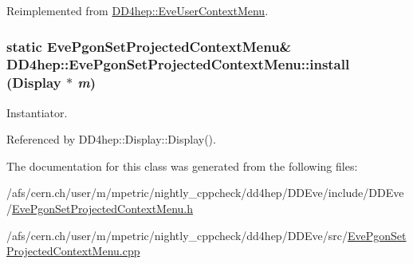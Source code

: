 Reimplemented from \hyperlink{class_d_d4hep_1_1_eve_user_context_menu_a05246cb30938d2a51dbb68468a3e8f8f}{DD4hep::EveUserContextMenu}.\hypertarget{class_d_d4hep_1_1_eve_pgon_set_projected_context_menu_a1704c29806f07b92caf26bee83b69722}{
\subsubsection[{install}]{\setlength{\rightskip}{0pt plus 5cm}static {\bf EvePgonSetProjectedContextMenu}\& DD4hep::EvePgonSetProjectedContextMenu::install ({\bf Display} $\ast$ {\em m})}}
\label{class_d_d4hep_1_1_eve_pgon_set_projected_context_menu_a1704c29806f07b92caf26bee83b69722}


Instantiator. 

Referenced by DD4hep::Display::Display().

The documentation for this class was generated from the following files:\begin{DoxyCompactItemize}
\item 
/afs/cern.ch/user/m/mpetric/nightly\_\-cppcheck/dd4hep/DDEve/include/DDEve/\hyperlink{_eve_pgon_set_projected_context_menu_8h}{EvePgonSetProjectedContextMenu.h}\item 
/afs/cern.ch/user/m/mpetric/nightly\_\-cppcheck/dd4hep/DDEve/src/\hyperlink{_eve_pgon_set_projected_context_menu_8cpp}{EvePgonSetProjectedContextMenu.cpp}\end{DoxyCompactItemize}
